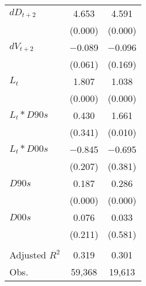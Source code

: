{\begin{longtable}{l*{2}{c}}
\addlinespace
$ dD_{t+2}$ &       4.653&       4.591\\
&     (0.000)&     (0.000)\\
\addlinespace
$ dV_{t+2}$ &    $-$0.089&    $-$0.096\\
&     (0.061)&     (0.169)\\
\addlinespace
$ L_{t}$    &       1.807&       1.038\\
&     (0.000)&     (0.000)\\
\addlinespace
$ L_{t} * D90s$&       0.430&       1.661\\
&     (0.341)&     (0.010)\\
\addlinespace
$ L_{t} * D00s$&    $-$0.845&    $-$0.695\\
&     (0.207)&     (0.381)\\
\addlinespace
$ D90s$     &       0.187&       0.286\\
&     (0.000)&     (0.000)\\
\addlinespace
$ D00s$     &       0.076&       0.033\\
&     (0.211)&     (0.581)\\
\\
Adjusted $ R^{2}$&       0.319&       0.301\\
Obs.        &      59,368&      19,613\\
\bottomrule
\end{longtable}
}
